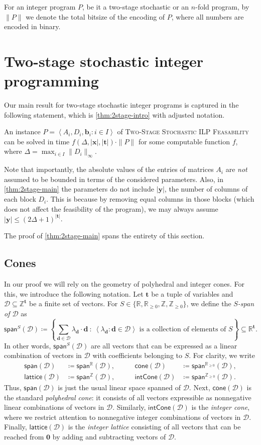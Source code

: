 \documentclass{theoretics}
\renewcommand{\leq}{\leqslant}
\renewcommand{\geq}{\geqslant}
\newcommand{\Dd}{\mathcal{D}}
\newcommand{\Z}{\mathbb{Z}}
\newcommand{\Zn}{\Z_{\geq 0}}
\newcommand{\R}{\mathbb{R}}
\newcommand{\myRn}{\R_{\geq 0}} %
\newcommand{\tup}[1]{{\mathbf{#1}}}
\newcommand{\xx}{\tup x}
\newcommand{\yy}{\tup y}
\newcommand{\tv}{\tup t}
\newcommand{\bb}{\tup b}
\newcommand{\dd}{\tup d}
\newcommand{\zero}{\tup 0}
\newcommand{\mset}[1]{\left\langle #1\right\rangle}
\newcommand{\stageFeas}{\textsc{Two-Stage Stochastic ILP Feasability}}
\newcommand{\nfold}{$n$-fold}
\newcommand{\stage}{two-stage stochastic}
\newcommand{\realcone}{\mathsf{cone}}
\newcommand{\intcone}{\mathsf{intCone}}
\newcommand{\lattice}{\mathsf{lattice}}
\newcommand{\spn}{\mathsf{span}}
\begin{document}
\medskip

For an integer program $P$, be it a \stage{} or an \nfold{} program, by $\|P\|$ we denote the total bitsize of the encoding of $P$, where all numbers are encoded in binary.
\section{Two-stage stochastic integer programming}

Our main result for \stage{} integer programs is captured in the following statement, which is \cref{thm:2stage-intro} with adjusted notation.

\begin{theorem}\label{thm:2stage-main}
An instance $P=\mset{A_i,D_i,\bb_i\colon i\in I}$ of \stageFeas{} can be solved in time $f(\Delta,|\xx|,|\tv|)\cdot \|P\|$ for some computable function $f$, where $\Delta=\max_{i\in I} \|D_i\|_\infty$.
\end{theorem}

Note that importantly, the absolute values of the entries of matrices $A_i$ are {\em{not}} assumed to be bounded in terms of the considered parameters. Also, in \cref{thm:2stage-main} the parameters do not include $|\yy|$, the  number of columns of each block $D_i$. This is because by removing equal columns in those blocks (which does not affect the feasibility of the program), we may always assume $|\yy|\leq (2\Delta+1)^{|\tv|}$.

The proof of \cref{thm:2stage-main} spans the entirety of this section.

\subsection{Cones}

In our proof we will rely on the geometry of polyhedral and integer cones. For this, we introduce the following notation. Let $\tv$ be a tuple of variables and $\Dd\subseteq \Z^\tv$ be a finite set of vectors.
For $S\in \{\R,\myRn,\Z,\Zn\}$, we define the {\em{$S$-span of $\Dd$}} as
$$\spn^S(\Dd)\coloneqq \left\{\sum_{\dd\in \Dd} \lambda_\dd\cdot  \dd~\colon~\mset{\lambda_\dd\colon \dd\in \Dd} \textrm{ is a collection of elements of }S\right\}\subseteq \R^{\tv}.$$
In other words, $\spn^S(\Dd)$ are all vectors that can be expressed as a linear combination of vectors in $\Dd$ with coefficients belonging to $S$.
For clarity, we write
\begin{align*}
\spn(\Dd)&\coloneqq \spn^{\R}(\Dd), &\qquad \realcone(\Dd)&\coloneqq \spn^{\myRn}(\Dd),\\
\lattice(\Dd)&\coloneqq \spn^{\Z}(\Dd), &\qquad \intcone(\Dd)&\coloneqq \spn^{\Zn}(\Dd).
\end{align*}
Thus, $\spn(\Dd)$ is just the usual linear space spanned of $\Dd$. Next, $\realcone(\Dd)$ is the standard {\em{polyhedral cone}}: it consists of all vectors expressible as nonnegative linear combinations of vectors in $\Dd$. Similarly, $\intcone(\Dd)$ is the {\em{integer cone}}, where we restrict attention to nonnegative integer combinations of vectors in $\Dd$. Finally, $\lattice(\Dd)$ is the {\em{integer lattice}} consisting of all vectors that can be reached from $\zero$ by adding and subtracting vectors of $\Dd$.
\end{document}
